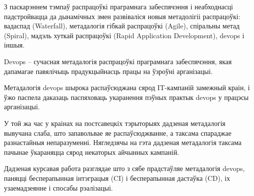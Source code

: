\sectionWithoutNumber{\prefacename}
З паскарэннем тэмпаў распрацоўкі праграмнага забеспячэння і
неабходнасці падстройвацца да дынамічных змен
развіваліся новыя метадолігіі распрацоўкі: вадаспад (Waterfall),
метадалогія гібкай распрацоўкі (Agile), спіральны метад (Spiral),
мадэль хуткай распрацоўкі (Rapid Application Development), devops і іншыя.


Devops -- сучасная метадалогія распрацоўкі праграмнага забеспячэння, якая
дапамагае павялічыць прадукцыйнасць працы на ўзроўні арганізацыі.

Метадалогія devops шырока распаўсюджана сярод IT-кампаній замежный краін,
і ўжо паспела даказаць паспяховаць укаранення пэўных практык devops
у працэсы арганізацыі.

У той жа час у краінах на постсавецкіх тэрыторыях дадзеная метадалогія
вывучана слаба, што запавольвае яе распаўсюджванне, а таксама спараджае
разнастайныя непаразуменні.
Нягледзячы на гэта дадзеная метадалогія таксама пачынае ўкараняцца сярод
некаторых айчынных кампаній.

Дадзеная курсавая работа разглядае што з сябе прадстаўляе метадалогія
devops, паняцці бесперапынная інтэграцыя (CI) і бесперапынная дастаўка (CD),
іх узаемадзеянне і спосабы рэалізацыі.

\clearpage
